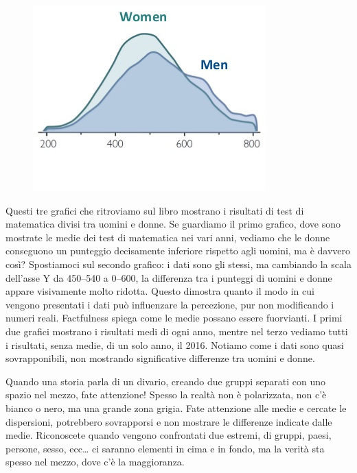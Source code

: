 \documentclass[12pt]{book} %
\begin{document}
\begin{figure}[H]
\begin{minipage}{0.3\textwidth}
    \end{minipage}
    \hfill
    \begin{minipage}{0.3\textwidth}
        \centering
        \includegraphics[width=\linewidth]{images/Libro-img004.jpg}
    \end{minipage}
\end{figure}

Questi tre grafici che ritroviamo sul libro mostrano i risultati di test di matematica divisi tra uomini e donne. Se
guardiamo il primo grafico, dove sono mostrate le medie dei test di matematica nei vari anni, vediamo che le donne
conseguono un punteggio decisamente inferiore rispetto agli uomini, ma è davvero così? Spostiamoci sul secondo grafico: i dati sono gli stessi, ma cambiando la scala dell’asse Y da 450–540 a 0–600, la differenza tra i punteggi di uomini e donne appare visivamente molto ridotta. Questo dimostra quanto il modo in cui vengono presentati i dati può influenzare la percezione, pur non modificando i numeri reali. Factfulness spiega come le medie possano essere fuorvianti. I primi due grafici mostrano i risultati medi di ogni
anno, mentre nel terzo vediamo tutti i risultati, senza medie, di un solo anno, il 2016. Notiamo come i dati sono quasi
sovrapponibili, non mostrando significative differenze tra uomini e donne.

Quando una storia parla di un divario, creando due gruppi separati con uno spazio nel mezzo, fate attenzione! Spesso la
realtà non è polarizzata, non c'è bianco o nero, ma una grande zona grigia. Fate attenzione alle
medie e cercate le dispersioni, potrebbero sovrapporsi e non mostrare le differenze indicate dalle medie. Riconoscete
quando vengono confrontati due estremi, di gruppi, paesi, persone, sesso, ecc… ci saranno elementi in cima e in
fondo, ma la verità sta spesso nel mezzo, dove c'è la maggioranza.
\end{document}
